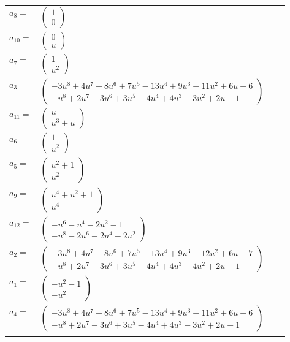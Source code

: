 \documentclass[1p]{elsarticle_modified}
\theoremstyle{definition}
\begin{document}
\begin{tabular}{m{7pt} m{180pt} m{7pt} m{180pt} }
\flushright $a_{8}=$&$\begin{pmatrix}1\\0\end{pmatrix}$ \\
\flushright $a_{10}=$&$\begin{pmatrix}0\\u\end{pmatrix}$ \\
\flushright $a_{7}=$&$\begin{pmatrix}1\\u^2\end{pmatrix}$ \\
\flushright $a_{3}=$&$\begin{pmatrix}-3 u^8+4 u^7-8 u^6+7 u^5-13 u^4+9 u^3-11 u^2+6 u-6\\- u^8+2 u^7-3 u^6+3 u^5-4 u^4+4 u^3-3 u^2+2 u-1\end{pmatrix}$ \\
\flushright $a_{11}=$&$\begin{pmatrix}u\\u^3+u\end{pmatrix}$ \\
\flushright $a_{6}=$&$\begin{pmatrix}1\\u^2\end{pmatrix}$ \\
\flushright $a_{5}=$&$\begin{pmatrix}u^2+1\\u^2\end{pmatrix}$ \\
\flushright $a_{9}=$&$\begin{pmatrix}u^4+u^2+1\\u^4\end{pmatrix}$ \\
\flushright $a_{12}=$&$\begin{pmatrix}- u^6- u^4-2 u^2-1\\- u^8-2 u^6-2 u^4-2 u^2\end{pmatrix}$ \\
\flushright $a_{2}=$&$\begin{pmatrix}-3 u^8+4 u^7-8 u^6+7 u^5-13 u^4+9 u^3-12 u^2+6 u-7\\- u^8+2 u^7-3 u^6+3 u^5-4 u^4+4 u^3-4 u^2+2 u-1\end{pmatrix}$ \\
\flushright $a_{1}=$&$\begin{pmatrix}- u^2-1\\- u^2\end{pmatrix}$ \\
\flushright $a_{4}=$&$\begin{pmatrix}-3 u^8+4 u^7-8 u^6+7 u^5-13 u^4+9 u^3-11 u^2+6 u-6\\- u^8+2 u^7-3 u^6+3 u^5-4 u^4+4 u^3-3 u^2+2 u-1\end{pmatrix}$\\&\end{tabular}
\end{document}
